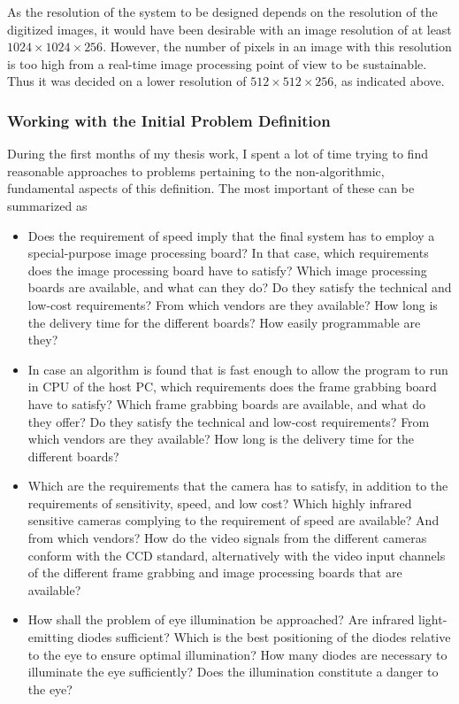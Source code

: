 \noindent As the resolution of the system to be designed depends on
the resolution of the digitized images, it would have been desirable
with an image resolution of at least $1024\times 1024\times 256$.
However, the number of pixels in an image with this resolution is too
high from a real-time image processing point of view to be
sustainable.  Thus it was decided on a lower resolution of $512\times
512\times 256$, as indicated above.

\subsubsection{Working with the Initial Problem Definition}

During the first months of my thesis work, I spent a lot of time
trying to find reasonable approaches to problems pertaining to the
non-algorithmic, fundamental aspects of this definition.  The most
important of these can be summarized as
\begin{itemize}
\item Does the requirement of speed imply that the final system has to
  employ a special-purpose image processing board?  In that case,
  which requirements does the image processing board have to satisfy?
  Which image processing boards are available, and what can they do?
  Do they satisfy the technical and low-cost requirements?  From which
  vendors are they available?  How long is the delivery time for the
  different boards?  How easily programmable are they?
\item In case an algorithm is found that is fast enough to allow the
  program to run in CPU of the host PC, which requirements does the
  frame grabbing board have to satisfy?  Which frame grabbing boards
  are available, and what do they offer?  Do they satisfy the
  technical and low-cost requirements?  From which vendors are they
  available?  How long is the delivery time for the different boards?
\item Which are the requirements that the camera has to satisfy, in
  addition to the requirements of sensitivity, speed, and low cost?
  Which highly infrared sensitive cameras complying to the requirement
  of speed are available?  And from which vendors?  How do the video
  signals from the different cameras conform with the CCD standard,
  alternatively with the video input channels of the different frame
  grabbing and image processing boards that are available?
\item How shall the problem of eye illumination be approached?  Are
  infrared light-emitting diodes sufficient?  Which is the best
  positioning of the diodes relative to the eye to ensure optimal
  illumination?  How many diodes are necessary to illuminate the eye
  sufficiently?  Does the illumination constitute a danger to the eye?
\end{itemize}

